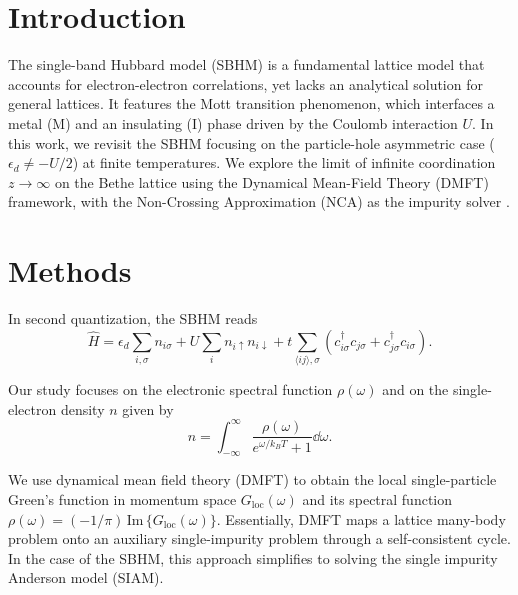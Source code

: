\documentclass[portrait]{a0poster}
\begin{document}
\begin{paracol}{2}
\large

\vspace{-2.0em}

\section{Introduction}

The single-band Hubbard model (SBHM) is a fundamental lattice model that accounts for electron-electron correlations, yet lacks an analytical solution for general lattices. It features the Mott transition phenomenon, which interfaces a metal (M) and an insulating (I) phase driven by the Coulomb interaction $U$. In this work, we revisit the SBHM focusing on the particle-hole asymmetric case ($\epsilon_d \neq -U/2$) at finite temperatures. We explore the limit of infinite coordination $z\to\infty$ on the Bethe lattice using the Dynamical Mean-Field Theory (DMFT) framework, with the Non-Crossing Approximation (NCA) as the impurity solver \cite{impurity-solvers}.

\vspace{-0.5em}
\section{Methods}

In second quantization, the SBHM reads
\begin{equation}
\hat{H} = \epsilon_d \sum_{i, \sigma} n_{i \sigma} + U \sum_{i } n_{i \uparrow} n_{i \downarrow} + t \sum_{\langle ij \rangle, \sigma} (c_{i \sigma }^{\dagger} c_{j \sigma} + c_{j \sigma }^{\dagger} c_{i \sigma}).
\label{eq:Hubbard_model}
\end{equation}

Our study focuses on the electronic spectral function $\rho(\omega)$ and on the single-electron density $n$ given by
\begin{equation}
n = \int_{-\infty}^{\infty} \frac{\rho(\omega)}{e^{\omega/k_B T} + 1} \dd{\omega}.
\end{equation}

We use dynamical mean field theory (DMFT) \cite{georges1996} to obtain the local single-particle Green's function in momentum space $G_{\text{loc}}(\omega)$ and its spectral function $\rho(\omega)=(-1/\pi) \, \text{Im} \, \{G_{\text{loc}}(\omega)\}$. Essentially, DMFT maps a lattice many-body problem onto an auxiliary single-impurity problem through a self-consistent cycle. In the case of the SBHM, this approach simplifies to solving the single impurity Anderson model (SIAM).


\end{paracol}
\end{document}
